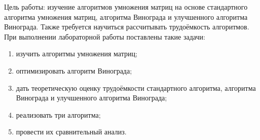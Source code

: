 \Introduction
Цель работы: изучение алгоритмов умножения матриц на основе стандартного алгоритма умножения матриц, алгоритма Винограда и улучшенного алгоритма Винограда. Также требуется научиться рассчитывать трудоёмкость алгоритмов.\\
При выполнении лабораторной работы поставлены такие задачи:
\begin{enumerate}[1)]
	\item изучить алгоритмы умножения матриц;
	\item оптимизировать алгоритм Винограда;
	\item дать теоретическую оценку трудоёмкости стандартного алгоритма, алгоритма Винограда и улучшенного алгоритма Винограда;
	\item реализовать три алгоритма;
	\item провести их сравнительный анализ.
\end{enumerate}